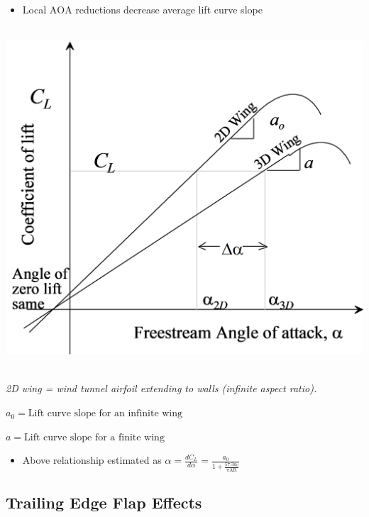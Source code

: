 \documentclass[
]{book}
\providecommand{\tightlist}{%
  \setlength{\itemsep}{0pt}\setlength{\parskip}{0pt}}
\begin{document}
\begin{itemize}
\tightlist
\item
  Local \(\mathrm{AOA}\) reductions decrease average lift curve slope
\end{itemize}

\includegraphics[width=5.715in,height=5.024in]{media/05/image16.svg}

\emph{2D wing = wind tunnel airfoil extending to walls (infinite aspect ratio).}

\(a_0 = \text{Lift curve slope for an infinite wing}\)

\(a = \text{Lift curve slope for a finite wing}\)

\begin{itemize}
\tightlist
\item
  Above relationship estimated as \(\alpha = \frac{dC_L}{d \alpha} = \frac{a_0}{1+\frac{57.3 a_0}{\pi \mathrm{AR}}}\)
\end{itemize}

\hypertarget{trailing-edge-flap-effects}{%
\subsection*{Trailing Edge Flap Effects}\label{trailing-edge-flap-effects}}
\end{document}
